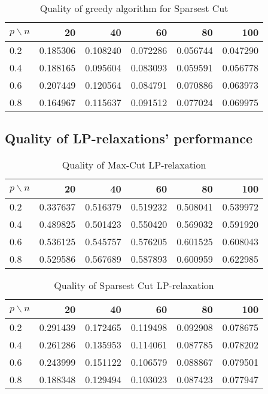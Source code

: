 \documentclass[12pt]{article}
\begin{document}
\begin{table}[H]
	\centering
	\begin{tabular}{|lrrrrr|}
		\toprule
		{$p \backslash n$} &       20  &       40  &       60  &       80  &       100 \\
		\midrule
		0.2 &  0.185306 &  0.108240 &  0.072286 &  0.056744 &  0.047290 \\
		0.4 &  0.188165 &  0.095604 &  0.083093 &  0.059591 &  0.056778 \\
		0.6 &  0.207449 &  0.120564 &  0.084791 &  0.070886 &  0.063973 \\
		0.8 &  0.164967 &  0.115637 &  0.091512 &  0.077024 &  0.069975 \\
		\bottomrule
	\end{tabular}
	\caption{Quality of greedy algorithm for Sparsest Cut}
\end{table}


\subsection{Quality of LP-relaxations' performance}

\begin{table}[H]
	\centering
	\begin{tabular}{|lrrrrr|}
		\toprule
		{$p \backslash n$} &       20  &       40  &       60  &       80  &       100 \\
		\midrule
		0.2 &  0.337637 &  0.516379 &  0.519232 &  0.508041 &  0.539972 \\
		0.4 &  0.489825 &  0.501423 &  0.550420 &  0.569032 &  0.591920 \\
		0.6 &  0.536125 &  0.545757 &  0.576205 &  0.601525 &  0.608043 \\
		0.8 &  0.529586 &  0.567689 &  0.587893 &  0.600959 &  0.622985 \\
		\bottomrule
	\end{tabular}
	\caption{Quality of Max-Cut LP-relaxation}
\end{table}

\begin{table}[H]
	\centering
	\begin{tabular}{|lrrrrr|}
		\toprule
		{$p \backslash n$} &       20  &       40  &       60  &       80  &       100 \\
		\midrule
		0.2 &  0.291439 &  0.172465 &  0.119498 &  0.092908 &  0.078675 \\
		0.4 &  0.261286 &  0.135953 &  0.114061 &  0.087785 &  0.078202 \\
		0.6 &  0.243999 &  0.151122 &  0.106579 &  0.088867 &  0.079501 \\
		0.8 &  0.188348 &  0.129494 &  0.103023 &  0.087423 &  0.077947 \\
		\bottomrule
	\end{tabular}
	\caption{Quality of Sparsest Cut LP-relaxation}
\end{table}
\end{document}
